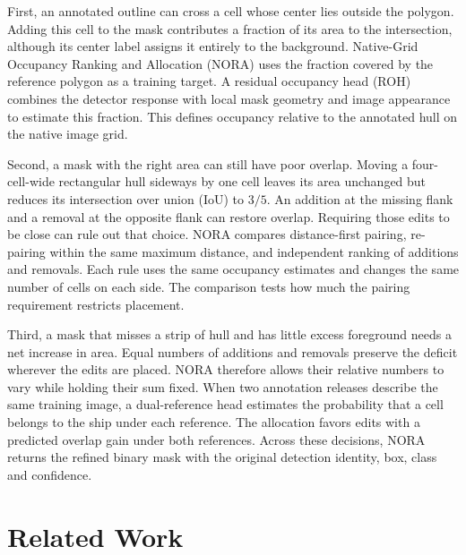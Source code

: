 \documentclass[journal]{IEEEtran}
\begin{document}
First, an annotated outline can cross a cell whose center lies outside the polygon. Adding this cell to the mask contributes a fraction of its area to the intersection, although its center label assigns it entirely to the background. Native-Grid Occupancy Ranking and Allocation (NORA) uses the fraction covered by the reference polygon as a training target. A residual occupancy head (ROH) combines the detector response with local mask geometry and image appearance to estimate this fraction. This defines occupancy relative to the annotated hull on the native image grid.

Second, a mask with the right area can still have poor overlap. Moving a four-cell-wide rectangular hull sideways by one cell leaves its area unchanged but reduces its intersection over union (IoU) to $3/5$. An addition at the missing flank and a removal at the opposite flank can restore overlap. Requiring those edits to be close can rule out that choice. NORA compares distance-first pairing, re-pairing within the same maximum distance, and independent ranking of additions and removals. Each rule uses the same occupancy estimates and changes the same number of cells on each side. The comparison tests how much the pairing requirement restricts placement.

Third, a mask that misses a strip of hull and has little excess foreground needs a net increase in area. Equal numbers of additions and removals preserve the deficit wherever the edits are placed. NORA therefore allows their relative numbers to vary while holding their sum fixed. When two annotation releases describe the same training image, a dual-reference head estimates the probability that a cell belongs to the ship under each reference. The allocation favors edits with a predicted overlap gain under both references. Across these decisions, NORA returns the refined binary mask with the original detection identity, box, class and confidence.

\section{Related Work}
\label{sec:related-work}
\end{document}
